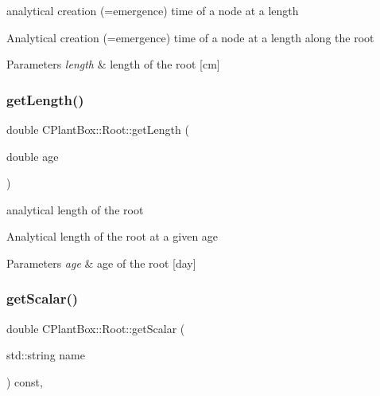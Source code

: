 analytical creation (=emergence) time of a node at a length 

Analytical creation (=emergence) time of a node at a length along the root


\begin{DoxyParams}{Parameters}
{\em length} & length of the root \mbox{[}cm\mbox{]} \\
\hline
\end{DoxyParams}
\mbox{\label{classCPlantBox_1_1Root_a3501e66ef57a4ecc04fb2130a9d5aa17}} 
\subsubsection{\texorpdfstring{get\+Length()}{getLength()}}
{\footnotesize\ttfamily double C\+Plant\+Box\+::\+Root\+::get\+Length (\begin{DoxyParamCaption}\item[{double}]{age }\end{DoxyParamCaption})}



analytical length of the root 

Analytical length of the root at a given age


\begin{DoxyParams}{Parameters}
{\em age} & age of the root \mbox{[}day\mbox{]} \\
\hline
\end{DoxyParams}
\mbox{\label{classCPlantBox_1_1Root_a23fac3d7c3b15e5f270d76b56c693ab9}} 
\subsubsection{\texorpdfstring{get\+Scalar()}{getScalar()}}
{\footnotesize\ttfamily double C\+Plant\+Box\+::\+Root\+::get\+Scalar (\begin{DoxyParamCaption}\item[{std\+::string}]{name }\end{DoxyParamCaption}) const\hspace{0.3cm}{\ttfamily [override]}, {\ttfamily [virtual]}}




